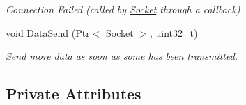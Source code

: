 \begin{DoxyCompactItemize}
\begin{DoxyCompactList}\small\item\em Connection Failed (called by \hyperlink{classns3_1_1Socket}{Socket} through a callback) \end{DoxyCompactList}\item 
void \hyperlink{classns3_1_1BulkSendApplication_a2641464e28f7d93996e74e8dbad6a15a}{Data\+Send} (\hyperlink{classns3_1_1Ptr}{Ptr}$<$ \hyperlink{classns3_1_1Socket}{Socket} $>$, uint32\+\_\+t)
\begin{DoxyCompactList}\small\item\em Send more data as soon as some has been transmitted. \end{DoxyCompactList}\end{DoxyCompactItemize}
\subsection*{Private Attributes}
